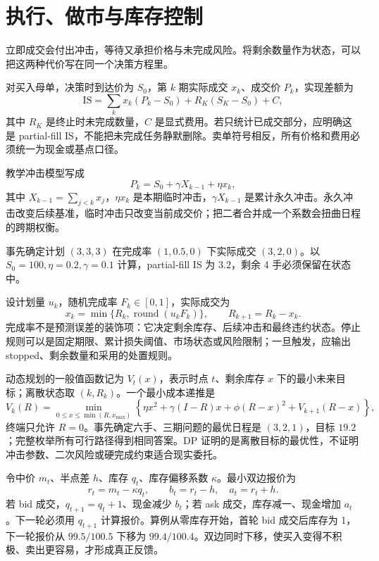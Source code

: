 \section{执行、做市与库存控制}
\label{ch:lower-microstructure-control}

\begin{itemize}
  
\end{itemize}

立即成交会付出冲击，等待又承担价格与未完成风险。将剩余数量作为状态，可以把这两种代价写在同一个决策方程里。



对买入母单，决策时到达价为 $S_0$，第 $k$ 期实际成交 $x_k$、成交价 $P_k$，实现差额为
\[
 \mathrm{IS}=\sum_k x_k(P_k-S_0)+R_K(S_K-S_0)+C,
\]
其中 $R_K$ 是终止时未完成数量，$C$ 是显式费用。若只统计已成交部分，应明确这是 partial-fill IS，不能把未完成任务静默删除。卖单符号相反，所有价格和费用必须统一为现金或基点口径。

教学冲击模型写成
\[
 P_k=S_0+\gamma X_{k-1}+\eta x_k,
\]
其中 $X_{k-1}=\sum_{j<k}x_j$，$\eta x_k$ 是本期临时冲击，$\gamma X_{k-1}$ 是累计永久冲击。永久冲击改变后续基准，临时冲击只改变当前成交价；把二者合并成一个系数会扭曲日程的跨期权衡\cite{almgren2001optimal}。

事先确定计划 $(3,3,3)$ 在完成率 $(1,0.5,0)$ 下实际成交 $(3,2,0)$。以 $S_0=100,\eta=0.2,\gamma=0.1$ 计算，partial-fill IS 为 $3.2$，剩余 4 手必须保留在状态中。


设计划量 $u_k$，随机完成率 $F_k\in[0,1]$，实际成交为
\[
 x_k=\min\{R_k,\operatorname{round}(u_kF_k)\},
 \qquad R_{k+1}=R_k-x_k.
\]
完成率不是预测误差的装饰项：它决定剩余库存、后续冲击和最终违约状态。停止规则可以是固定期限、累计损失阈值、市场状态或风险限制；一旦触发，应输出 stopped、剩余数量和采用的处置规则。

动态规划的一般值函数记为 $V_t(x)$，表示时点 $t$、剩余库存 $x$ 下的最小未来目标；离散状态取 $(k,R_k)$。一个最小成本递推是
\[
 V_k(R)=\min_{0\le x\le\min(R,x_{\max})}
 \left\{\eta x^2+\gamma(I-R)x+\phi(R-x)^2+V_{k+1}(R-x)\right\},
\]
终端只允许 $R=0$。事先确定六手、三期问题的最优日程是 $(3,2,1)$，目标 $19.2$；完整枚举所有可行路径得到相同答案。DP 证明的是离散目标的最优性，不证明冲击参数、二次风险或硬完成约束适合现实委托。


令中价 $m_t$、半点差 $h$、库存 $q_t$、库存偏移系数 $\kappa$。最小双边报价为
\[
 r_t=m_t-\kappa q_t,
 \qquad b_t=r_t-h,\quad a_t=r_t+h.
\]
若 bid 成交，$q_{t+1}=q_t+1$、现金减少 $b_t$；若 ask 成交，库存减一、现金增加 $a_t$。下一轮必须用 $q_{t+1}$ 计算报价。算例从零库存开始，首轮 bid 成交后库存为 1，下一轮报价从 $99.5/100.5$ 下移为 $99.4/100.4$。双边同时下移，使买入变得不积极、卖出更容易，才形成真正反馈。

